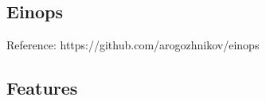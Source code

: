 \documentclass[8pt]{extarticle}
\begin{document}


\begin{multicols*}{2}

  \section{Einops}

  Reference: https://github.com/arogozhnikov/einops
  
  \subsection{Features}
  

\end{multicols*}
\end{document}
